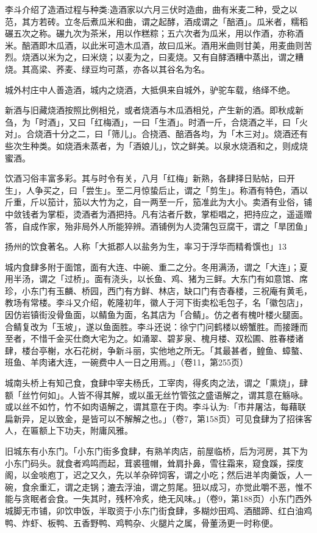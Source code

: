 李斗介绍了造酒过程与种类:造酒家以六月三伏时造曲，曲有米麦二种，受之以范，其方若砖。立冬后煮瓜米和曲，谓之起酵，酒成谓之「醅酒」。瓜米者，糯稻碾五次之称。碾九次为茶米，用以作糕粽；五六次者为瓜米，用以作酒，亦称酒米。醅酒即木瓜酒，以此米可造木瓜酒，故曰瓜米。酒用米曲则甘美，用麦曲则苦烈。烧酒以米为之，曰米烧；以麦为之，曰麦烧。又有自酵酒糟中蒸出，谓之糟烧。其高梁、荞麦、绿豆均可蒸，亦各以其谷名为名。

城外村庄中人善造酒，城内之烧酒，大抵俱来自城外，驴驼车载，络绎不绝。

新酒与旧藏烧酒按照比例相兑，或者烧酒与木瓜酒相兑，产生新的酒。即秋成新刍，为「时酒」，又曰「红梅酒」，一曰「生酒」。时酒一斤，合烧酒之半，曰「火对」。合烧酒十分之二，曰「筛儿」。合挠酒、醅酒各均，为「木三对」。烧酒还有些次生种类。如烧酒未蒸者，为「酒娘儿」，饮之鲜美。以泉水烧酒和之，则成烧蜜酒。

饮酒习俗丰富多彩。其与时令有关，八月「红梅」新熟，各肆择日贴帖，曰开生」，人争买之，曰「尝生」。至二月惊蛰后止，谓之「剪生」。称酒有特色，酒以斤重，斤以笳计，笳以大竹为之，自一两至一斤，笳准此为大小。卖酒有业俗，铺中敛钱者为掌柜，烫酒者为酒把持。凡有沽者斤数，掌柜唱之，把持应之，遥遥赠答，自成作家，殆非局外人所能猝辨。酒铺例为人烫蒲包豆腐干，谓之「旱团鱼」



扬州的饮食著名。人称「大抵郡人以盐务为生，率习于浮华而精肴馔也」13

城内食肆多附于面馆，面有大连、中碗、重二之分。冬用满汤，谓之「大连」；夏用半汤，谓之「过桥」。面有浇头，以长鱼、鸡、猪为三鲜。大东门有如意馆、席珍，小东门有玉麟、桥园，西门有方鲜、林店，缺口门有杏春楼，三祝庵有黄毛，教场有常楼。李斗又介绍，乾隆初年，徽人于河下街卖松毛包子，名「徽包店」，因仿岩镇街没骨鱼面，以鲭鱼为面，名其店为「合鲭」。仿之者有槐叶楼火腿面。合鲭复改为「玉坡」，遂以鱼面胜。李斗还说：徐宁门问鹤楼以螃蟹胜。而接踵而至者，不惜千金买仕商大宅为之。如涌翠、碧芗泉、槐月楼、双松圃、胜春楼诸肆，楼台亭榭，水石花树，争新斗丽，实他地之所无。「其最甚者，鳇鱼、蟑螯、班鱼、羊肉诸大连，一碗费中人一日之用焉。」（卷11，第255页）

城南头桥上有知己食，食肆中宰夫杨氏，工宰肉，得炙肉之法，谓之「熏烧」，肆额「丝竹何如」。人皆不得其解，或以虽无丝竹管弦之盛语解之，谓其意在觞咏。或以丝不如竹，竹不如肉语解之，谓其意在于肉。李斗认为:「市井屠沽，每藉联扁新异，足以致金，是皆可以不解解之也。」（卷7，第158页）可见食肆为了招徕客人，在匾额上下功夫，附庸风雅。

旧城东有小东门。「小东门街多食肆，有熟羊肉店，前屋临桥，后为河房，其下为小东门码头。就食者鸡鸣而起，茸裘氊帽，耸肩扑鼻，雪往霜来，窥食蹊，探庋阁，以金啖庖丁，迟之又久，先以羊杂碎饲客，谓之小吃；然后进羊肉羹饭，人一碗，食余重汇，谓之走锅；漉去浮油，谓之剪尾。狃以成习，亦觉此嚼不恶，惟不能与贪眠者会食。一失其时，残杯冷炙，绝无风味。」（卷9，第188页）小东门西外城脚无市铺，卯饮申饭，半取资于小东门街食肆，多糊炒田鸡、酒醋蹄、红白油鸡鸭、炸虾、板鸭、五香野鸭、鸡鸭杂、火腿片之属，骨董汤更一时称便。

